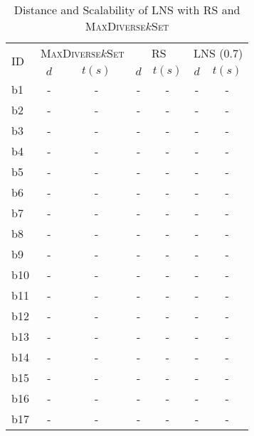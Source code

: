 \begin{longtable}{|l|c|c|c|c|c|c|}
\caption{\label{tab:dist_max_rs_lns} Distance and Scalability of \ac{LNS} with \ac{RS} and \textsc{MaxDiverse$k$Set}}\\
\hline
\multirow{2}{*}{ID}&\multicolumn{2}{c|}{\textsc{MaxDiverse$k$Set}}&\multicolumn{2}{c|}{{RS}}&\multicolumn{2}{c|}{LNS (0.7)}\\
\cline{2-7}
&$d$&$t(s)$&$d$&$t(s)$&$d$&$t(s)$\\
\hline
b1&- & -&- & -&- & -
\\
b2&- & -&- & -&- & -
\\
b3&- & -&- & -&- & -
\\
b4&- & -&- & -&- & -
\\
b5&- & -&- & -&- & -
\\
b6&- & -&- & -&- & -
\\
b7&- & -&- & -&- & -
\\
b8&- & -&- & -&- & -
\\
b9&- & -&- & -&- & -
\\
b10&- & -&- & -&- & -
\\
b11&- & -&- & -&- & -
\\
b12&- & -&- & -&- & -
\\
b13&- & -&- & -&- & -
\\
b14&- & -&- & -&- & -
\\
b15&- & -&- & -&- & -
\\
b16&- & -&- & -&- & -
\\
b17&- & -&- & -&- & -
\\
\hline
\end{longtable}
